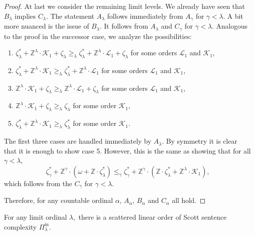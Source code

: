 \documentclass[10pt,a4paper]{amsart}
\providecommand{\L}{\mathcal{L}}
\providecommand{\Pinf}[1]{\Pi^{\mathrm{in}}_{#1}}
\newcommand{\Z}{\mathbb{Z}}
\newcommand{\K}{\mathcal{K}}
\renewcommand{\L}{\mathcal{L}}
\begin{document}
\begin{proof}
At last we consider the remaining limit levels. We already have seen that
$B_\lambda$ implies $C_\lambda$. The statement $A_\lambda$ follows immediately from $A_\gamma$ for $\gamma<\lambda$. 
A bit more nuanced is the issue of $B_\lambda$. It follows from $A_\lambda$ and $C_\gamma$ for $\gamma<\lambda$.
Analogous to the proof in the successor case, we analyze the possibilities:
\begin{enumerate}
\item $\zeta^*_{\lambda} +\Z^{\lambda}\cdot
    \K_1+\zeta_{\lambda}\geq_\lambda \zeta^*_{\lambda} +\Z^{\lambda}\cdot \L_1+\zeta_{\lambda} $ for some orders $\L_1$ and $\K_1$,
\item $\zeta^*_{\lambda} +\Z^{\lambda}\cdot \K_1\geq_\lambda \zeta^*_{\lambda} +\Z^{\lambda}\cdot \L_1 $ for some orders $\L_1$ and $\K_1$,
\item $\Z^{\lambda}\cdot \K_1+\zeta_{\lambda}\geq_\lambda \Z^{\lambda}\cdot \L_1+\zeta_{\lambda} $ for some orders $\L_1$ and $\K_1$,
\item $\Z^{\lambda}\cdot \K_1+\zeta_{\lambda}\geq_\lambda \zeta_{\lambda} $ for some order $\K_1$,
\item $\zeta^*_{\lambda} +\Z^{\lambda}\cdot \K_1\geq_\lambda\zeta^*_{\lambda} $ for some order $\K_1$.
\end{enumerate}

The first three cases are handled immediately by $A_{\lambda}$. By symmetry it is clear that it is enough to show case 5. However, this is the same as showing that for all $\gamma<\lambda$,
$$\zeta_{\gamma}^* + \Z^\gamma\cdot(\omega +  \Z\cdot\zeta_{\lambda}^*)
\leq_{\gamma}\zeta_{\gamma}^* + \Z^{\gamma}\cdot
(\Z\cdot\zeta_{\lambda}^*+\Z^\lambda\cdot \K_1),$$
which follows from the $C_\gamma$ for $\gamma<\lambda$.

Therefore, for any countable ordinal $\alpha$, $A_\alpha$, $B_\alpha$ and $C_\alpha$ all hold.
\end{proof}

\begin{proposition}\label{prop:scatteredlimit}
For any limit ordinal $\lambda,$ there is a scattered linear order of Scott sentence complexity $\Pinf{\lambda}.$
\end{proposition}
\end{document}
